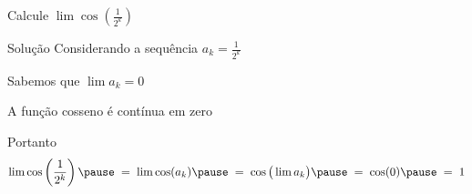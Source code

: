 \begin{question}
Calcule
\(
  \lim \cos\left(\frac{1}{2^k}\right)
\)
\end{question}


\begin{resolution}{Solução}
  Considerando a sequência \( a_k = \frac{1}{2^k} \)

  \pause
  \medskip
  Sabemos que \(\lim a_k=0\)

  \pause
  \medskip
  A função cosseno é contínua em zero

  \pause
  \medskip
  Portanto
  \pause
  \[
    \lim\cos\left(\frac{1}{2^k}\right)
    \pause
    \;=\; \lim\cos(a_k)
    \pause
    \;=\; \cos\big(\lim a_k\big)
    \pause
    \;=\; \cos(0)
    \pause
    \;=\; 1
  \]
\end{resolution}

